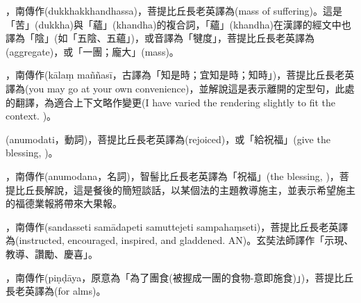 \startitemgroup[noteitems]
\item{}，南傳作(dukkhakkhandhassa)，菩提比丘長老英譯為(mass of suffering)。這是「苦」(dukkha)與「蘊」(khandha)的複合詞，「蘊」(khandha)在漢譯的經文中也譯為「陰」(如「五陰、五蘊」)，或音譯為「犍度」，菩提比丘長老英譯為(aggregate)，或「一團；龐大」(mass)。
\stopitemgroup

\startitemgroup[noteitems]
\item{}，南傳作(kālaṃ maññasī，古譯為「知是時；宜知是時；知時」)，菩提比丘長老英譯為(you may go at your own convenience)，並解說這是表示離開的定型句，此處的翻譯，為適合上下文略作變更(I have varied the rendering slightly to fit the context. )。
\stopitemgroup

\startitemgroup[noteitems]
\item{}(anumodati，動詞)，菩提比丘長老英譯為(rejoiced)，或「給祝福」(give the blessing, )。
\item{}，南傳作(anumodana，名詞)，智髻比丘長老英譯為「祝福」(the blessing, )，菩提比丘長解說，這是餐後的簡短談話，以某個法的主題教導施主，並表示希望施主的福德業報將帶來大果報。
\stopitemgroup

\startitemgroup[noteitems]
\item{}，南傳作(sandasseti samādapeti samuttejeti sampahaṃseti)，菩提比丘長老英譯為(instructed, encouraged, inspired, and gladdened. AN)。玄奘法師譯作「示現、教導、讚勵、慶喜」。
\stopitemgroup

\startitemgroup[noteitems]
\item{}，南傳作(piṇḍāya，原意為「為了團食(被握成一團的食物-意即施食)」)，菩提比丘長老英譯為(for alms)。
\stopitemgroup

